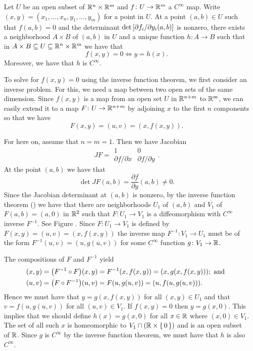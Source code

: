 \documentclass[letterpaper, 11pt, oneside]{book}
\begin{document}
\begin{thrm}\label{thrm: implicit_func}
  Let $U$ be an open subset of $\mathbb{R}^{n} \times \mathbb{R}^{m}$ and $f\colon U \to \mathbb{R}^{m}$ a $C^{\infty}$ map.
  Write $(x, y) = (x_{1}, \ldots, x_{n}, y_{1}, \ldots, y_{m})$ for a point in $U$.
  At a point $(a, b) \in U$ such that $f(a, b) = 0$ and the determinant $\det\bqty{\partial f_{i} / \partial y_{i}(a, b)}$ is nonzero, there exists a neighborhood $A \times B$ of $(a, b)$ in $U$ and a unique function $h\colon A \to B$ such that in $A \times B \subseteq U \subseteq \mathbb{R}^{n} \times \mathbb{R}^{m}$ we have that
  \[
    f(x, y) = 0 \iff y = h(x).
  \]
  Moreover, we have that $h$ is $C^{\infty}$.
\end{thrm}
\begin{pf}
  To solve for $f(x, y) = 0$ using the inverse function theorem, we first consider an inverse problem.
  For this, we need a map between two open sets of the same dimension.
  Since $f(x, y)$ is a map from an open set $U$ in $\mathbb{R}^{n + m}$ to $\mathbb{R}^{m}$, we can easily extend it to a map $F\colon  U \to \mathbb{R}^{n + m}$ by adjoining $x$ to the first $n$ components so that we have
  \[
    F(x, y) = (u, v) = (x, f(x, y)).
  \]

  For here on, assume that $n = m = 1$.
  Then we have Jacobian
  \[
    JF = \begin{matrix} 1 & 0 \\ \partial f / \partial x & \partial f / \partial y \end{matrix}.
  \]
  At the point $(a, b)$ we have that
  \[
    \det JF(a, b) = \frac{\partial f}{\partial y}(a, b) \neq 0.
  \]
  Since the Jacobian determinant at $(a, b)$ is nonzero, by the inverse function theorem () we have that there are neighborhoods $U_{1}$ of $(a, b)$ and $V_{1}$ of $F(a, b) = (a, 0)$ in $\mathbb{R}^{2}$ such that $F\colon U_{1} \to V_{1}$ is a diffeomorphism with $C^{\infty}$ inverse $F^{-1}$.
  See Figure .
  Since $F\colon U_{1} \to V_{1}$ is defined by $F(x, y) = (u, v) = (x, f(x, y))$ the inverse map $F^{-1}\colon V_{1} \to U_{1}$ must be of the form $F^{-1}(u, v) = (u, g(u, v))$ for some $C^{\infty}$ function $g\colon V_{1} \to \mathbb{R}$.

  The compositions of $F$ and $F^{-1}$ yield
  \begin{align*}
    (x, y) &= \pqty{F^{-1} \circ F}(x, y) = F^{-1}(x, f(x, y)) = (x, g(x, f(x, y))); \text{ and } \\
    (u, v) &= \pqty{F \circ F^{-1}}(u, v) = F(u, g(u, v)) = (u, f(u, g(u, v))).
  \end{align*}
  Hence we must have that $y = g(x, f(x, y))$ for all $(x, y) \in U_{1}$ and that $v = f(u, g(u, v))$ for all $(u, v) \in V_{1}$.
  If $f(x, y) = 0$ then $y = g(x, 0)$.
  This implies that we should define $h(x) = g(x, 0)$ for all $x \in \mathbb{R}$ where $(x, 0) \in V_{1}$.
  The set of all such $x$ is homeomorphic to $V_{1} \cap \pqty{\R \times \set{0}}$ and is an open subset of $\mathbb{R}$.
  Since $g$ is $C^{\infty}$ by the inverse function theorem, we must have that $h$ is also $C^{\infty}$.


\end{pf}
\end{document}
